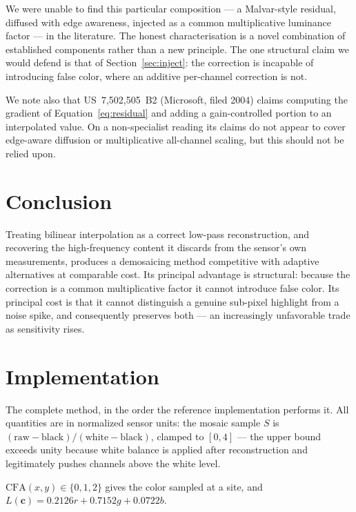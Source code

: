 \documentclass[10pt,a4paper]{article}
\begin{document}
We were unable to find this particular composition --- a Malvar-style residual,
diffused with edge awareness, injected as a common multiplicative luminance
factor --- in the literature. The honest characterisation is a novel
combination of established components rather than a new principle. The one
structural claim we would defend is that of Section~\ref{sec:inject}: the correction is
incapable of introducing false color, where an additive per-channel correction
is not.

We note also that US~7,502,505~B2 (Microsoft, filed 2004) claims computing the
gradient of Equation~\ref{eq:residual} and adding a gain-controlled portion to
an interpolated value. On a non-specialist reading its claims do not appear to
cover edge-aware diffusion or multiplicative all-channel scaling, but this
should not be relied upon.

\section{Conclusion}

Treating bilinear interpolation as a correct low-pass reconstruction, and
recovering the high-frequency content it discards from the sensor's own
measurements, produces a demosaicing method competitive with adaptive
alternatives at comparable cost. Its principal advantage is structural: because
the correction is a common multiplicative factor it cannot introduce false
color. Its principal cost is that it cannot distinguish a genuine sub-pixel
highlight from a noise spike, and consequently preserves both --- an
increasingly unfavorable trade as sensitivity rises.

\appendix

\section{Implementation}
\label{app:pseudocode}

The complete method, in the order the reference implementation performs it. All
quantities are in normalized sensor units: the mosaic sample $S$ is
$(\text{raw} - \text{black}) / (\text{white} - \text{black})$, clamped to
$[0,4]$ --- the upper bound exceeds unity because white balance is applied
after reconstruction and legitimately pushes channels above the white level.

$\mathrm{CFA}(x,y) \in \{0,1,2\}$ gives the color sampled at a site, and
$L(\mathbf{c}) = 0.2126r + 0.7152g + 0.0722b$.
\end{document}
